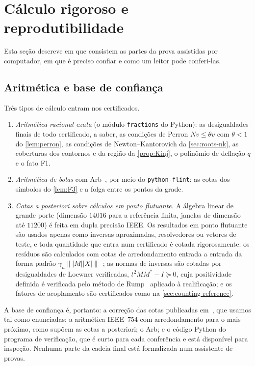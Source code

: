 \section{Cálculo rigoroso e reprodutibilidade}\label{sec:computation}

Esta seção descreve em que consistem as partes da prova assistidas por computador, em que é preciso confiar e como
um leitor pode conferi-las.

\subsection{Aritmética e base de confiança}\label{sec:computation-arith}

Três tipos de cálculo entram nos certificados.
\begin{enumerate}[label=(\alph*),leftmargin=*]
\item \emph{Aritmética racional exata} (o módulo \texttt{fractions} do Python): as desigualdades finais de todo
  certificado, a saber, as condições de Perron $Nv\le\theta v$ com $\theta<1$ do
  \cref{lem:perron}, as condições de Newton--Kantorovich da \cref{sec:roots-nk}, as coberturas dos contornos e
  da região da \cref{prop:Kinj}, o polinômio de deflação $q$ e o fato F1.
\item \emph{Aritmética de bolas} com Arb~\cite{Arb}, por meio do \texttt{python-flint}: as cotas dos símbolos do
  \cref{lem:F3} e a folga entre os pontos da grade.
\item \emph{Cotas a posteriori sobre cálculos em ponto flutuante.} A álgebra linear de grande porte (dimensão $14016$ para a
  referência finita, janelas de dimensão até $11200$) é feita em dupla precisão IEEE. Os resultados em ponto flutuante
  são usados apenas como inversas aproximadas, resolvedores ou vetores de teste, e toda quantidade que entra num certificado é
  cotada rigorosamente: os resíduos são calculados com cotas de arredondamento entrada a entrada da forma padrão
  $\gamma_n\||M||X|\|$~\cite{Higham2002}; as normas de inversas são cotadas por desigualdades de Loewner verificadas,
  $t^2MM^*-I\succeq0$, cuja positividade definida é verificada pelo método de Rump~\cite{Rump2006} aplicado à
  realificação; e os fatores de acoplamento são certificados como na \cref{sec:counting-reference}.
\end{enumerate}
A base de confiança é, portanto: a correção das cotas publicadas em~\cite{RT2019}, que usamos tal como enunciadas;
a aritmética IEEE~754 com arredondamento para o mais próximo, como supõem as cotas a posteriori; o Arb; e o código Python do
programa de verificação, que é curto para cada conferência e está disponível para inspeção. Nenhuma parte da cadeia final
está formalizada num assistente de provas.

